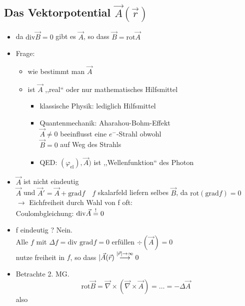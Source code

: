 \documentclass[titlepage,12pt,a4paper,ngerman]{report}
\newcommand{\tx}[1]{\textrm{#1}}
\begin{document}
\subsection{Das Vektorpotential $ \vec{A}(\vec{r}) $}
\begin{itemize}
	\item da $ \tx{div}\vec{B} = 0 $ gibt es $ \vec{A} $, so dass $ \vec{B} = \tx{rot} \vec{A} $
	\item Frage: 
	\begin{itemize}
		\item wie bestimmt man $ \vec{A} $
		\item ist $ \vec{A} $ ,,real`` oder nur mathematisches Hilfsmittel
		\begin{itemize}
			\item klassische Physik: lediglich Hilfsmittel
			\item Quantenmechanik: Aharahou-Bohm-Effekt\\
			$ \vec{A} \neq 0 $ beeinflusst eine $ e^- $-Strahl obwohl\\
			$ \vec{B} = 0 $ auf Weg des Strahls
			\item QED: $ (\varphi_{\tx{el}}) , \vec{A}) $ ist ,,Wellenfunktion`` des Photon
		\end{itemize}
	\end{itemize}
	\item $ \vec{A} $ ist nicht eindeutig\\
	$ \vec{A} $ und $ \vec{A}'  = \vec{A} + \tx{grad} f \quad f$ skalarfeld liefern selbes $ \vec{B} $, da $ \tx{rot} ( \tx{grad}f) = 0 $\\
	$ \rightarrow $  Eichfreiheit durch Wahl von f oft:\\
	Coulombgleichung: $ \tx{div} \vec{A} \buildrel ! \over = 0 $
	\item f eindeutig ? Nein.\\
	Alle $ f $ mit $ \Delta f = \tx{div grad} f = 0 $ erfüllen $ \div(\vec{A}) = 0 $\\
	nutze freiheit in $ f $, so dass $ |\vec{A}(\vec{r}) \buildrel |\vec{r}| \rightarrow \infty \over \longrightarrow 0 $
	\item  Betrachte 2. MG.
	$$ \tx{rot} \vec{B} = \vec{\nabla} \times (\vec{\nabla} \times \vec{A}) = \dots = - \Delta \vec{A}$$
	also\\
	\begin{center}
	\end{center}
\end{itemize}
\end{document}
